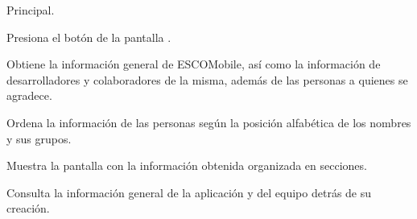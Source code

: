 	\begin{UCtrayectoria}{Principal.}

		\UCpaso[\UCactor] Presiona el botón  de la pantalla .

		\UCpaso Obtiene la información general de ESCOMobile, así como la información de desarrolladores y colaboradores
		de la misma, además de las personas a quienes se agradece. 

		\UCpaso Ordena la información de las personas según la posición alfabética de los nombres y sus grupos. 

		\UCpaso Muestra la pantalla  con la información
		obtenida organizada en secciones. 

		\UCpaso [\UCactor] Consulta la información general de la aplicación y del equipo detrás de su creación.

	\end{UCtrayectoria}



